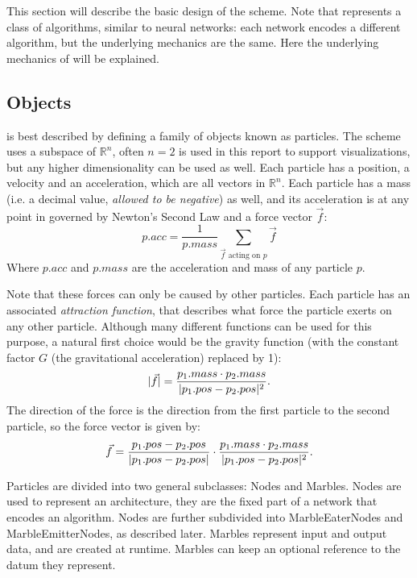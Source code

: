 This section will describe the basic design of the \nenwin scheme. Note that \nenwin represents a class of algorithms, similar to neural networks: each network encodes a different algorithm, but the underlying mechanics are the same. Here the underlying mechanics of \nenwin will be explained.

\subsection{Objects}
\nenwin is best described by defining a family of objects known as particles. The scheme uses a subspace of $\mathbb{R}^n$, often $n=2$ is used in this report to support visualizations, but any higher dimensionality can be used as well. Each particle has a position, a velocity and an acceleration, which are all vectors in $\mathbb{R}^n$. Each particle has a mass (i.e. a decimal value, \textit{allowed to be negative}) as well, and its acceleration is at any point in governed by Newton's Second Law \cite{principia} and a force vector $\vec{f}$:
\begin{equation}
    p.acc = \frac{1}{p.mass} \sum_{\vec{f} \text{ acting on } p}\vec{f}
\end{equation}
Where $p.acc$ and $p.mass$ are the acceleration and mass of any particle $p$.

Note that these forces can only be caused by other particles. Each particle has an associated \textit{attraction function}, that describes what force the particle exerts on any other particle. Although many different functions can be used for this purpose, a natural first choice would be the gravity function (with the constant factor $G$ (the gravitational acceleration) replaced by 1):
\begin{equation}
    \lvert \vec{f} \rvert = \frac{p_1.mass \cdot p_2.mass}{\lvert p_1.pos - p_2.pos \rvert^2}. \label{eq:newton_grav_force}
\end{equation}
The direction of the force is the direction from the first particle to the second particle, so the force vector is given by:
\begin{equation}
    \vec{f} = \frac{p_1.pos - p_2.pos}{\lvert p_1.pos - p_2.pos \rvert} \cdot\frac{p_1.mass \cdot p_2.mass}{\lvert p_1.pos - p_2.pos \rvert^2}. \label{eq:newton_grav_force}
\end{equation}

Particles are divided into two general subclasses: Nodes and Marbles. Nodes are used to represent an architecture, they are the fixed part of a \nenwin network that encodes an algorithm. Nodes are further subdivided into MarbleEaterNodes and MarbleEmitterNodes, as described later. Marbles represent input and output data, and are created at runtime. Marbles can keep an optional reference to the datum they represent.

